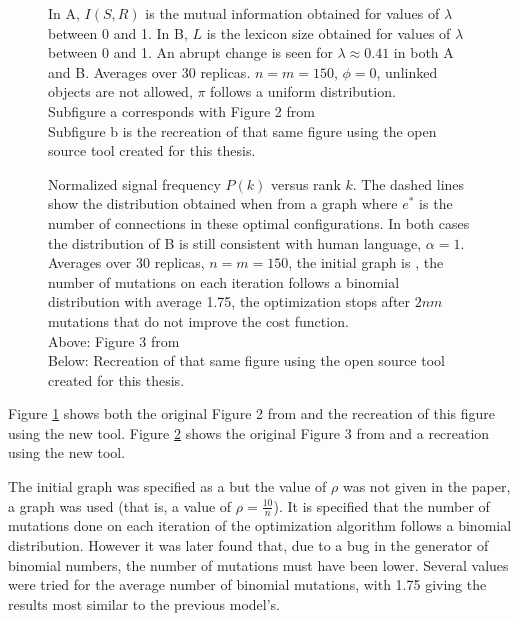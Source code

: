 \begin{figure}
  \caption{
    In A, $I(S,R)$ is the mutual information obtained for values of $\lambda$ between 0 and 1.
    In B, $L$ is the lexicon size obtained for values of $\lambda$ between 0 and 1.
    An abrupt change is seen for $\lambda \approx 0.41$ in both A and B.
    Averages over 30 replicas.
    $n=m=150$, $\phi=0$, unlinked objects are not allowed, $\pi$ follows a uniform distribution.\\
    Subfigure a corresponds with Figure 2 from \cite{Ferrer2003a}\\
    Subfigure b is the recreation of that same figure using the open source tool created for this thesis.
  }
  \label{fig:fig2_2003}
\end{figure}

\begin{figure}
  \caption{
    Normalized signal frequency $P(k)$ versus rank $k$.
    The dashed lines show the distribution obtained when from a  graph where $e^*$ is the number of connections in these optimal configurations.
    In both cases the distribution of B is still consistent with human language, $\alpha=1$.
    Averages over 30 replicas, $n=m=150$, the initial graph is , the number of mutations on each iteration follows a binomial distribution with average 1.75, the optimization stops after $2nm$ mutations that do not improve the cost function.\\
    Above: Figure 3 from \cite{Ferrer2003a}\\
    Below: Recreation of that same figure using the open source tool created for this thesis.
  }
  \label{fig:fig3_2003}
\end{figure}

Figure \ref{fig:fig2_2003} shows both the original Figure 2 from \cite{Ferrer2003a} and the recreation of this figure using the new tool.
Figure \ref{fig:fig3_2003} shows the original Figure 3 from \cite{Ferrer2003a} and a recreation using the new tool.

The initial graph was specified as a  but the value of $\rho$ was not given in the paper, a  graph was used (that is, a value of $\rho=\frac{10}{n}$).
It is specified that the number of mutations done on each iteration of the optimization algorithm follows a binomial distribution.
However it was later found that, due to a bug in the generator of binomial numbers, the number of mutations must have been lower.
Several values were tried for the average number of binomial mutations, with 1.75 giving the results most similar to the previous model's.


